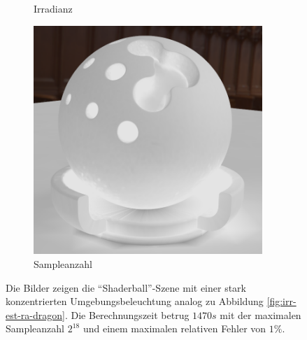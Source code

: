 \begin{figure}[h]
\begin{subfigure}[t]{0.33\textwidth}
				\caption{Irradianz}
			\end{subfigure}
			\begin{subfigure}[t]{0.33\textwidth}
				\center
				\includegraphics[width=0.95\textwidth]{pic/irr_est-ra-shaderball4-scount.png}
				\caption{Sampleanzahl}
			\end{subfigure}
			\caption[Vierte adaptive Vertex-Irradiance-Map anhand der \enquote{Shaderball}-Szene]{Die Bilder zeigen die \enquote{Shaderball}-Szene mit einer stark konzentrierten Umgebungsbeleuchtung analog zu Abbildung \ref{fig:irr-est-ra-dragon}. Die Berechnungszeit betrug $1470\unit{s}$ mit der maximalen Sampleanzahl $2^{18}$ und einem maximalen relativen Fehler von $1\unit{\%}$.}
			\label{fig:irr-est-ra-shaderball4}
		\end{figure}

